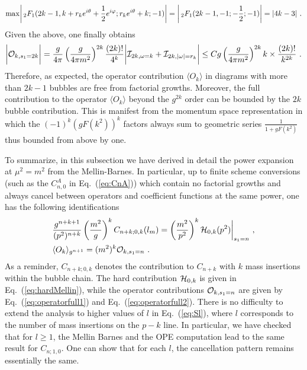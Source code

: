 \documentclass[a4paper,11pt]{article}
\begin{document}
\begin{align}
{\rm max} \bigg|\,_2F_1(2k-1,k+r_ke^{i\theta}+\frac{1}{2}e^{i\varphi};r_ke^{i\theta}+k;-1)\bigg|=\bigg|\,_2F_1(2k-1,-1;-\frac{1}{2};-1)\bigg|=|4k-3|\ .
\end{align}
Given the above, one finally obtains
\begin{align}
\bigg|{\cal O}_{k,s_1=2k}\bigg|=\frac{g}{4\pi}\left(\frac{g}{4\pi m^2}\right)^{2k}\frac{(2k)!}{4^k}\bigg|{\cal I}_{2k,\omega=k}+{\cal I}_{2k,|\omega|=r_k}\bigg|\le Cg\left(\frac{g}{4\pi m^2}\right)^{2k}k\times\frac{(2k)!}{k^{2k}} \ .
\end{align}
Therefore, as expected, the operator contribution $\langle O_{k}\rangle$ in diagrams with more than $2k-1$ bubbles are free from factorial growths. Moreover, the full contribution to the operator $\langle O_{k}\rangle$ beyond the $g^{2k}$ order can be bounded by the $2k$ bubble contribution. This is manifest from the momentum space representation in which the $(-1)^k(gF(k^2))^{k}$ factors always sum to geometric series $\frac{1}{1+gF(k^2)}$ thus bounded from above by one.

To summarize, in this subsection we have derived in detail the power expansion at $\mu^2=m^2$ from the Mellin-Barnes. In particular, up to finite scheme conversions (such as the $C_{n,0}^A$ in Eq.~(\ref{eq:CnA})) which contain no factorial growths and always cancel between operators and coefficient functions at the same power, one has the following identifications
\begin{align}
&\frac{g^{n+k+1}}{(p^2)^{n+k}}\left(\frac{m^2}{g}\right)^{k}C_{n+k;0,k}(l_m)=\left(\frac{m^2}{p^2}\right)^k{\cal H}_{0,k}(p^2)\bigg|_{s_1=n} \ , \label{eq:iden1} \\
&\langle O_k \rangle_{g^{n+1}}=(m^2)^k{\cal O}_{k,s_1=n} \ . \label{eq:iden2}
\end{align}
As a reminder, $C_{n+k;0,k}$ denotes the contribution to $C_{n+k}$ with $k$ mass insertions within the bubble chain. The hard contribution ${\cal H}_{0,k}$ is given in Eq.~(\ref{eq:hardMellin}), while the operator contributions ${\cal O}_{k,s_1=n}$ are given by Eq.~(\ref{eq:operatorfull1}) and Eq.~(\ref{eq:operatorfull2}). There is no difficulty to extend the analysis to higher values of $l$ in Eq.~(\ref{eq:Sl}), where $l$ corresponds to the number of mass insertions on the $p-k$ line. In particular, we have checked that for $l\ge 1$, the Mellin Barnes and the OPE computation lead to the same result for $C_{n;1,0}$.  One can show that for each $l$, the cancellation pattern remains essentially the same.
\end{document}
